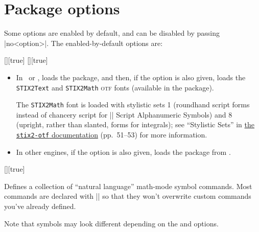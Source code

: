 \documentclass{ltxguidex}
\begin{document}
\tableofcontents
\vfill
\pagebreak

\section{Package options}

Some options are enabled by default, and can be disabled by passing
|no<option>|. The enabled-by-default options are:
\begin{keys}
  [\bool][true]
  [\bool][true]
    \begin{itemize}
      \item In \XeTeX\ or \LuaTeX, loads the  package, and
        then, if the  option is also given, loads the
        \texttt{STIX2Text} and \texttt{STIX2Math} \textsc{otf} fonts (available
        in the  package).

        The \texttt{STIX2Math} font is loaded with stylistic sets 1 (roundhand
        script forms instead of chancery script for |\mathcal| Script
        Alphanumeric Symbols) and 8 (upright, rather than slanted, forms for
        integrals); see ``Stylistic Sets'' in
        \href{http://mirrors.ctan.org/fonts/stix2-otf/STIXTwoMath-Regular.pdf}{the
        \texttt{stix2-otf} documentation} (pp.~51--53) for more information.

      \item In other engines, if the  option is also given, loads
        the  package from .
    \end{itemize}

  [\bool][true]

    Defines a collection of ``natural language'' math-mode symbol commands.
    Most commands are declared with |\ProvideDocumentCommand| so that they
    won't overwrite custom commands you've already defined.

    Note that symbols may look different depending on the  and
     options.


\end{keys}
\end{document}
